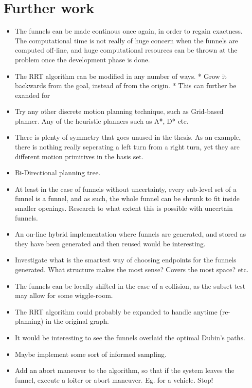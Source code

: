 \chapter{Further work}

\begin{itemize}
  \item The funnels can be made continous once again, in order to regain
    exactness. The computational time is not really of huge concern when the
    funnels are computed off-line, and huge computational resources can be
    thrown at the problem once the development phase is done.
  \item The RRT algorithm can be modified in any number of ways.
    * Grow it backwards from the goal, instead of from the origin.
    * This can further be exanded for 

  \item Try any other discrete motion planning technique, such as Grid-based
    planner. Any of the heuristic planners such as A*, D* etc.

  \item There is plenty of symmetry that goes unused in the thesis. As an
    example, there is nothing really seperating a left turn from a right turn,
    yet they are different motion primitives in the basis set.

  \item Bi-Directional planning tree.

  \item At least in the case of funnels without uncertainty, every sub-level set
    of a funnel is a funnel, and as such, the whole funnel can be shrunk to fit
    inside smaller openings. Research to what extent this is possible with
    uncertain funnels.

  \item An on-line hybrid implementation where funnels are generated, and stored
    as they have been generated and then reused would be interesting.

  \item  Investigate what is the smartest way of choosing endpoints for the
    funnels generated. What structure makes the most sense? Covers the most
    space? etc.

  \item The funnels can be locally shifted in the case of a collision, as the
    subset test may allow for some wiggle-room.

  \item The RRT algorithm could probably be expanded to handle anytime
    (re-planning) in the original graph.

  \item It would be interesting to see the funnels overlaid the optimal Dubin's paths.

  \item Maybe implement some sort of informed sampling.

  \item Add an abort maneuver to the \rrtfunnel{} algorithm, so that if the
    system leaves the funnel, execute a loiter or abort maneuver. Eg. for a
    vehicle. Stop!

\end{itemize}